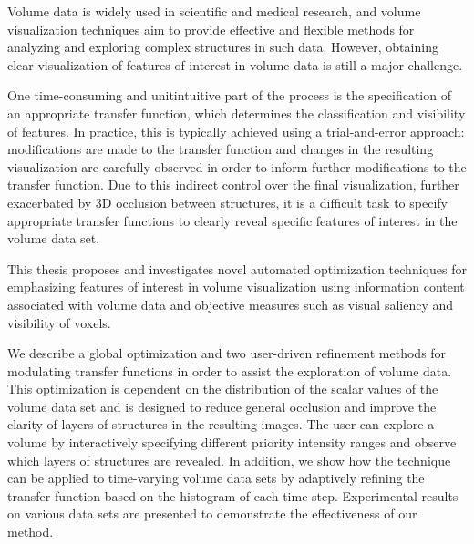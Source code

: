 \documentclass[a4paper, 12pt, oneside]{report}         %
\begin{document}
\begin{thesisabstract}
	
Volume data is widely used in scientific and medical research, and volume visualization techniques aim to provide effective and flexible methods for analyzing and exploring complex structures in such data. However, obtaining clear visualization of features of interest in volume data is still a major challenge.

One time-consuming and unitintuitive part of the process is the specification of an appropriate transfer function, which determines the classification and visibility of features. In practice, this is typically achieved using a trial-and-error approach: modifications are made to the transfer function and changes in the resulting visualization are carefully observed in order to inform further modifications to the transfer function. Due to this indirect control over the final visualization, further exacerbated by 3D occlusion between structures, it is a difficult task to specify appropriate transfer functions to clearly reveal specific features of interest in the volume data set.

This thesis proposes and investigates novel automated optimization techniques for emphasizing features of interest in volume visualization using information content associated with volume data and objective measures such as visual saliency and visibility of voxels.

We describe a global optimization and two user-driven refinement methods for modulating transfer functions in order to assist the exploration of volume data.
This optimization is dependent on the distribution of the scalar values of the volume data set and is designed to reduce general occlusion and improve the clarity of layers of structures in the resulting images.
The user can explore a volume by interactively specifying different priority intensity ranges and observe which layers of structures are revealed. In addition, we show how the technique can be applied to time-varying volume data sets by adaptively refining the transfer function based on the histogram of each time-step. 
Experimental results on various data sets are presented to demonstrate the effectiveness of our method.


\end{thesisabstract}
\end{document}
